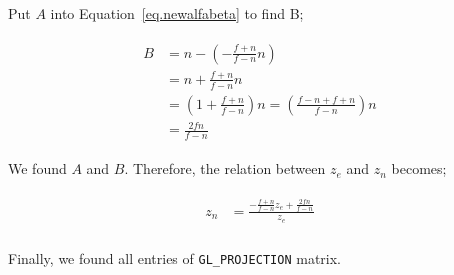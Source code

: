 Put $A$ into Equation~\ref{eq.newalfabeta} to find B;

\begin{equation}
\begin{aligned}
\begin{split}
    B &= n-(-\frac{f+n}{f-n}n)\\
      &= n+\frac{f+n}{f-n}n\\
      &= \left(1+\frac{f+n}{f-n}\right)n
      =  \left(\frac{f-n+f+n}{f-n}\right)n\\
      &= \frac{2fn}{f-n}
\end{split}    
\end{aligned}
\label{eq.newbeta}
\end{equation}

We found $A$ and $B$. Therefore, the relation between $z_e$ and $z_n$ becomes; 

\begin{equation}
\begin{aligned}
\begin{split}
    z_n &= \frac{-\frac{f+n}{f-n}z_e+\frac{2fn}{f-n}}{z_e}\\
\end{split}    
\end{aligned}
\label{eq.newznfinal}
\end{equation}

Finally, we found all entries of \verb|GL_PROJECTION| matrix.